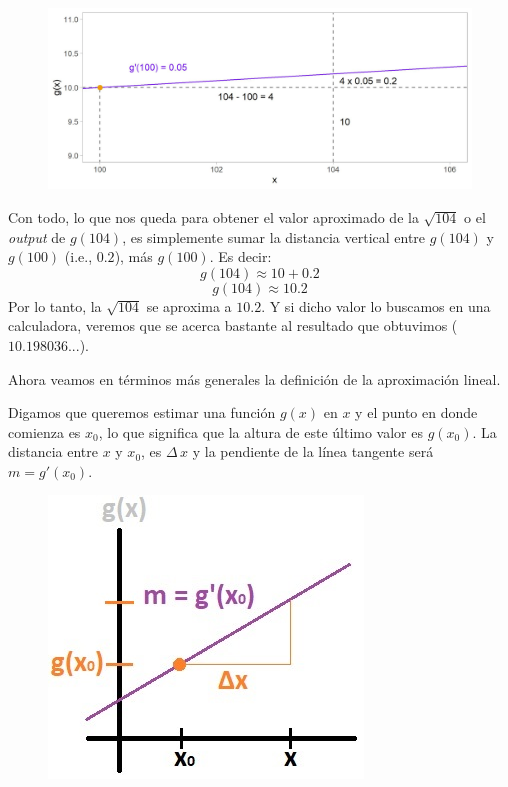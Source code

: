 \documentclass[12pt]{article}
\begin{document}
\begin{figure}[hbt!]
\centering
\includegraphics[scale=0.7]{img/approx_lin_sqrt_3.jpg}
\end{figure}

Con todo, lo que nos queda para obtener el valor aproximado de la $\sqrt{104}$ o el \textit{output} de $g(104)$, es simplemente sumar la distancia vertical entre $g(104)$ y $g(100)$ (i.e., $0.2$), más $g(100)$. Es decir:
\[g(104) \approx 10 + 0.2\]
\[g(104) \approx 10.2\]
Por lo tanto, la $\sqrt{104}$ se aproxima a $10.2$. Y si dicho valor lo buscamos en una calculadora, veremos que se acerca bastante al resultado que obtuvimos ($10.198036...$). 

Ahora veamos en términos más generales la definición de la aproximación lineal.

Digamos que queremos estimar una función $g(x)$ en $x$ y el punto en donde comienza es $x_{0}$, lo que significa que la altura de este último valor es $g(x_{0})$. La distancia entre $x$ y $x_{0}$, es $\Delta \, x$ y la pendiente de la línea tangente será $m = g'(x_{0})$.

\begin{figure}[hbt!]
\centering
\includegraphics[scale=0.7]{img/approx_lin_gral_expl.jpg}
\end{figure}
\end{document}
